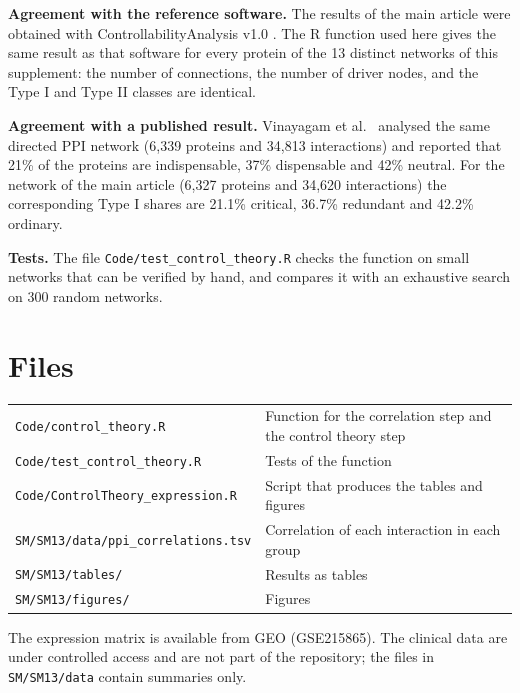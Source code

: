 \documentclass[11pt,a4paper]{article}
\begin{document}
\textbf{Agreement with the reference software.} The results of the main article were obtained with ControllabilityAnalysis v1.0 \cite{liu2011}. The R function used here gives the same result as that software for every protein of the 13 distinct networks of this supplement: the number of connections, the number of driver nodes, and the Type I and Type II classes are identical.

\textbf{Agreement with a published result.} Vinayagam et al.\ \cite{vinayagam2016} analysed the same directed PPI network (6,339 proteins and 34,813 interactions) and reported that 21\% of the proteins are indispensable, 37\% dispensable and 42\% neutral. For the network of the main article (6,327 proteins and 34,620 interactions) the corresponding Type I shares are 21.1\% critical, 36.7\% redundant and 42.2\% ordinary.

\textbf{Tests.} The file \texttt{Code/test\_control\_theory.R} checks the function on small networks that can be verified by hand, and compares it with an exhaustive search on 300 random networks.

\section{Files}

\begin{tabular}{@{}p{7.6cm}p{8cm}@{}}
\texttt{Code/control\_theory.R} & Function for the correlation step and the control theory step \\
\texttt{Code/test\_control\_theory.R} & Tests of the function \\
\texttt{Code/ControlTheory\_expression.R} & Script that produces the tables and figures \\
\texttt{SM/SM13/data/ppi\_correlations.tsv} & Correlation of each interaction in each group \\
\texttt{SM/SM13/tables/} & Results as tables \\
\texttt{SM/SM13/figures/} & Figures \\
\end{tabular}

The expression matrix is available from GEO (GSE215865). The clinical data are under controlled access and are not part of the repository; the files in \texttt{SM/SM13/data} contain summaries only.
\end{document}

